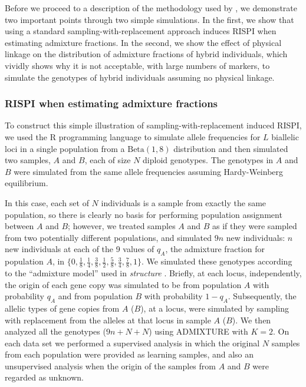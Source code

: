 Before we proceed to a description of the methodology used by \gscramble{},
we demonstrate two important points through two simple simulations.  In the first,
we show that using a standard sampling-with-replacement
approach induces RISPI when estimating admixture fractions. In the second, we show
the effect of physical linkage on the distribution of admixture fractions of hybrid individuals,
which vividly shows why it is not acceptable, with large numbers of markers, to simulate
the genotypes of hybrid individuals assuming no physical linkage.


\subsubsection*{RISPI when estimating admixture fractions}
\label{sec:rispi-sim}

To construct this simple illustration of sampling-with-replacement induced RISPI, 
we used the R programming language \citep{Rcoreteam} to
simulate allele frequencies for $L$ biallelic
loci in a single population from a $\mathrm{Beta}(1, 8)$ distribution and then simulated
two samples, $A$ and $B$, each of size $N$ diploid genotypes. The genotypes in $A$ and $B$ were simulated
from the same allele frequencies assuming Hardy-Weinberg equilibrium.

In this case,
each set of $N$ individuals is a sample from exactly the same population, so
there is clearly no basis for performing population assignment between $A$ and $B$;
however, we treated samples $A$ and $B$ as if they were sampled from two potentially different
populations, and simulated $9n$ new individuals: $n$ new individuals at each of the 9 values of
$q_A$, the admixture fraction for population $A$, in  $\{0, \frac{1}{8}, \frac{1}{4}, \frac{3}{8}, \frac{1}{2}, \frac{5}{8}, \frac{3}{4}, \frac{7}{8}, 1\}$.
We simulated these genotypes according to the ``admixture model'' used in {\em structure} \citep{pritchard2000inference}.  Briefly, at each
locus, independently, the origin
of each gene copy was simulated to be from
population $A$ with probability $q_A$ and from population $B$ with probability $1-q_A$.  Subsequently,
the allelic types of gene copies from $A$ ($B$), at a locus, were simulated by sampling with replacement
from the alleles at that locus in sample $A$ ($B$).
We then analyzed all the genotypes ($9n + N + N$) using ADMIXTURE with $K=2$. On each data set we performed a supervised analysis in which the original
$N$ samples from each
population were provided as learning samples, and also an
unsupervised analysis when the origin of the samples from $A$ and $B$ were regarded as unknown.

